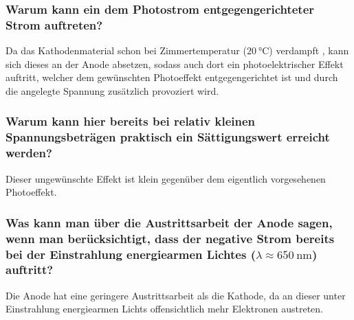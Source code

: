 \subsubsection*{Warum kann ein dem Photostrom entgegengerichteter Strom auftreten?}


Da das Kathodenmaterial schon bei Zimmertemperatur ($\SI{20}{\celsius}$) verdampft \cite{versuchsanleitung},
kann sich dieses an der Anode absetzen,
sodass auch dort ein photoelektrischer Effekt auftritt,
welcher dem gewünschten Photoeffekt entgegengerichtet ist
und durch die angelegte Spannung zusätzlich provoziert wird.

\subsubsection*{Warum kann hier bereits bei relativ kleinen Spannungsbeträgen praktisch ein Sättigungswert erreicht werden?}

Dieser ungewünschte Effekt ist klein gegenüber dem eigentlich vorgesehenen Photoeffekt.

\subsubsection*{Was kann man über die Austrittsarbeit der Anode sagen, wenn man berücksichtigt,
dass der negative Strom bereits bei der Einstrahlung energiearmen Lichtes ($\lambda \approx \SI{650}{\nano\meter}$) auftritt?}

Die Anode hat eine geringere Austrittsarbeit als die Kathode,
da an dieser unter Einstrahlung energiearmen Lichts offensichtlich mehr Elektronen austreten.
